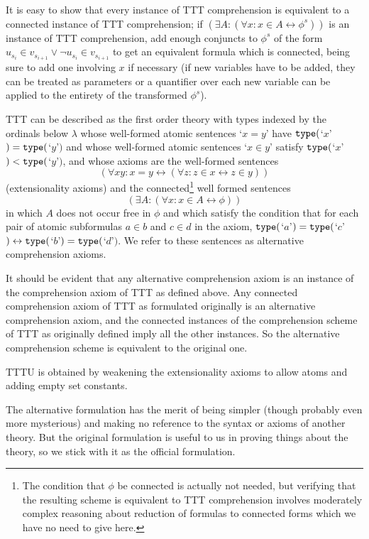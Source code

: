 \documentclass{article}
\theoremstyle{definition}
\theoremstyle{remark}
\begin{document}
{{It is easy to show that every instance of TTT comprehension is equivalent to a connected instance of TTT comprehension;  if $(\exists A:(\forall x:x \in A \leftrightarrow \phi^s))$ is an instance of TTT comprehension, add enough conjuncts to $\phi^s$ of the form $u_{s_i} \in v_{s_{i+1}} \vee \neg u_{s_i} \in v_{s_{i+1}}$ to get an equivalent formula which is connected, being sure to add one involving $x$ if necessary (if new variables have to be added, they can be treated as parameters or a quantifier over each new variable can be applied to the entirety of the transformed $\phi^s$).

TTT can be described as the first order theory with types indexed by the ordinals below $\lambda$ whose well-formed atomic sentences `$x=y$' have ${\tt type}($`$x$'$) = {\tt type}($`$y$'$)$ and whose well-formed atomic sentences `$x \in y$' satisfy ${\tt type}($`$x$'$) < {\tt type}($`$y$'$)$, and whose axioms are the well-formed sentences
$$(\forall xy:x=y \leftrightarrow (\forall z:z \in x \leftrightarrow z \in y))$$ (extensionality axioms) and the connected\footnote{The condition that $\phi$ be connected is actually not needed, but verifying that the resulting scheme is equivalent to TTT comprehension involves moderately complex reasoning about reduction of formulas to connected forms which we have no need to give here.} well formed sentences $$(\exists A:(\forall x:x \in A \leftrightarrow \phi))$$ in which  $A$ does not occur free in $\phi$ and which satisfy the condition that for each pair of atomic subformulas $a \in b$ and $c \in d$ in the axiom, ${\tt type}($`$a$'$) = {\tt type}($`$c$'$)\leftrightarrow {\tt type}($`$b$'$) = {\tt type}($`$d$'$)$.  We refer to these sentences as alternative comprehension axioms.

It should be evident that any alternative comprehension axiom is an instance of the comprehension axiom of TTT as defined above.  Any connected comprehension axiom of TTT as formulated originally is an alternative comprehension axiom, and the connected instances of the comprehension scheme of TTT as originally defined imply all the other instances.  So the alternative comprehension scheme is equivalent to the original one.

TTTU is obtained by weakening the extensionality axioms to allow atoms and adding empty set constants.

The alternative formulation has the merit of being simpler (though probably even more mysterious) and making no reference to the syntax or axioms of another theory.  But the original formulation is useful to us in proving things about the theory, so we stick with it as the official formulation.}

}
\end{document}
